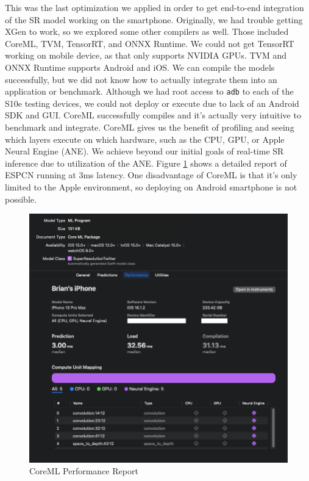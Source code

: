 \documentclass{article}
\begin{document}
This was the last optimization we applied in order to get end-to-end integration of the SR model working on the smartphone. Originally, we had trouble getting XGen to work, so we explored some other compilers as well. Those included CoreML, TVM, TensorRT, and ONNX Runtime. We could not get TensorRT working on mobile device, as that only supports NVIDIA GPUs. TVM and ONNX Runtime supports Android and iOS. We can compile the models successfully, but we did not know how to actually integrate them into an application or benchmark. Although we had root access to \verb|adb| to each of the S10e testing devices, we could not deploy or execute due to lack of an Android SDK and GUI. CoreML successfully compiles and it's actually very intuitive to benchmark and integrate. CoreML gives us the benefit of profiling and seeing which layers execute on which hardware, such as the CPU, GPU, or Apple Neural Engine (ANE). We achieve beyond our initial goals of real-time SR inference due to utilization of the ANE. Figure \ref{fig:coreml} shows a detailed report of ESPCN running at 3ms latency. One disadvantage of CoreML is that it's only limited to the Apple environment, so deploying on Android smartphone is not possible.

\begin{figure}
	\centerline{\includegraphics[width=5in]{../final/figures/coreml.png}}
	\caption{CoreML Performance Report}
	\label{fig:coreml}
\end{figure}
\end{document}

